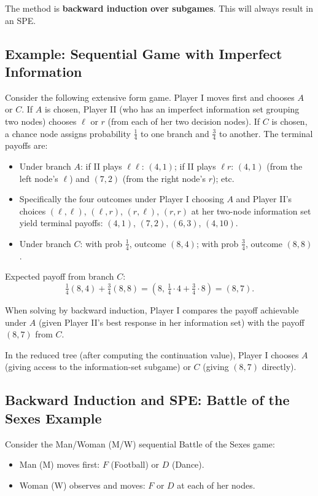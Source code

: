 \documentclass[12pt, a4paper]{article}
\begin{document}
\begin{intubox}
The method is \textbf{backward induction over subgames}. This will always result in an SPE.
\end{intubox}

\subsection{Example: Sequential Game with Imperfect Information}

Consider the following extensive form game. Player I moves first and chooses $A$ or $C$. If $A$ is chosen, Player II (who has an imperfect information set grouping two nodes) chooses $\ell$ or $r$ (from each of her two decision nodes). If $C$ is chosen, a chance node assigns probability $\tfrac{1}{4}$ to one branch and $\tfrac{3}{4}$ to another. The terminal payoffs are:

\begin{itemize}
  \item Under branch $A$: if II plays $\ell\ell$: $(4,1)$; if II plays $\ell r$: $(4,1)$ (from the left node's $\ell$) and $(7,2)$ (from the right node's $r$); etc.
  \item Specifically the four outcomes under Player I choosing $A$ and Player II's choices $(\ell,\ell)$, $(\ell,r)$, $(r,\ell)$, $(r,r)$ at her two-node information set yield terminal payoffs:
    $(4,1)$, $(7,2)$, $(6,3)$, $(4,10)$.
  \item Under branch $C$: with prob $\tfrac{1}{4}$, outcome $(8,4)$; with prob $\tfrac{3}{4}$, outcome $(8,8)$.
\end{itemize}

\noindent Expected payoff from branch $C$:
\[
  \tfrac{1}{4}(8,4) + \tfrac{3}{4}(8,8) = (8,\, \tfrac{1}{4}\cdot 4 + \tfrac{3}{4}\cdot 8) = (8,7).
\]

When solving by backward induction, Player I compares the payoff achievable under $A$ (given Player II's best response in her information set) with the payoff $(8,7)$ from $C$.

\medskip
In the reduced tree (after computing the continuation value), Player I chooses $A$ (giving access to the information-set subgame) or $C$ (giving $(8,7)$ directly).

\subsection{Backward Induction and SPE: Battle of the Sexes Example}

Consider the Man/Woman (M/W) sequential Battle of the Sexes game:
\begin{itemize}
  \item Man (M) moves first: $F$ (Football) or $D$ (Dance).
  \item Woman (W) observes and moves: $F$ or $D$ at each of her nodes.
\end{itemize}
\end{document}
